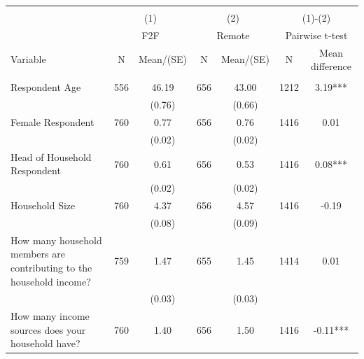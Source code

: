 
\begin{tabular}{@{\extracolsep{5pt}}lcccccc}
\\[-1.8ex]\hline \hline \\[-1.8ex]
 & \multicolumn{2}{c}{(1)}  & \multicolumn{2}{c}{(2)}  & \multicolumn{2}{c}{(1)-(2)} \\
 & \multicolumn{2}{c}{F2F}  & \multicolumn{2}{c}{Remote}  & \multicolumn{2}{c}{Pairwise t-test}  \\
Variable & N & Mean/(SE) & N & Mean/(SE) & N & Mean difference \\ \hline \\[-1.8ex] 
Respondent Age   & 556    & 46.19    & 656    & 43.00    & 1212    & 3.19***   \\
 &   & (0.76)  &   & (0.66)  &   &  \\ [1ex]
Female Respondent   & 760    & 0.77    & 656    & 0.76    & 1416    & 0.01   \\
 &   & (0.02)  &   & (0.02)  &   &  \\ [1ex]
Head of Household Respondent   & 760    & 0.61    & 656    & 0.53    & 1416    & 0.08***   \\
 &   & (0.02)  &   & (0.02)  &   &  \\ [1ex]
Household Size   & 760    & 4.37    & 656    & 4.57    & 1416    & -0.19   \\
 &   & (0.08)  &   & (0.09)  &   &  \\ [1ex]
How many household members are contributing to the household income?   & 759    & 1.47    & 655    & 1.45    & 1414    & 0.01   \\
 &   & (0.03)  &   & (0.03)  &   &  \\ [1ex]
How many income sources does your household have?   & 760    & 1.40    & 656    & 1.50    & 1416    & -0.11***   \\

\end{tabular}
